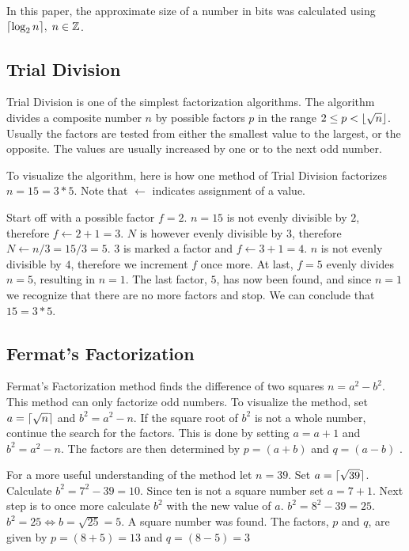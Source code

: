 In this paper, the approximate size of a number in bits was calculated using $\lceil\log_2{n}\rceil,\;n\in\mathbb{Z}$.

\subsection{Trial Division}
Trial Division is one of the simplest factorization algorithms. The algorithm divides a composite number $n$ by possible factors $p$ in the range $2 \leq p < \lfloor\sqrt{n}\rfloor$. Usually the factors are tested from either the smallest value to the largest, or the opposite. The values are usually increased by one or to the next odd number\cite{trialDivisionAndFermats}.

To visualize the algorithm, here is how one method of Trial Division factorizes $n=15=3*5$. Note that $\leftarrow$ indicates assignment of a value.

Start off with a possible factor $f=2$. $n=15$ is not evenly divisible by $2$, therefore $f\leftarrow2+1=3$. $N$ is however evenly divisible by $3$, therefore $N\leftarrow n/3=15/3=5$. $3$ is marked a factor and $f\leftarrow3+1=4$. $n$ is not evenly divisible by $4$, therefore we increment $f$ once more. At last, $f=5$ evenly divides $n=5$, resulting in $n=1$. The last factor, $5$, has now been found, and since $n=1$ we recognize that there are no more factors and stop. We can conclude that $15=3*5$.

\subsection{Fermat's Factorization}
Fermat's Factorization method finds the difference of two squares $n = a^2 - b^2$. This method can only factorize odd numbers. To visualize the method, set $a = \lceil\sqrt{n}\rceil$ and $b^2 = a^2 - n$. If the square root of $b^2$ is not a whole number, continue the search for the factors. This is done by setting $a = a + 1$ and $b^2 = a^2 - n$. The factors are then determined by $p = (a + b)$ and $q = (a - b)$ \cite{trialDivisionAndFermats}.

For a more useful understanding of the method let $n=39$. Set $a=\lceil\sqrt{39}\rceil$. Calculate $b^2 = 7^2-39 = 10$. Since ten is not a square number set $a=7+1$. Next step is to once more calculate $b^2$ with the new value of $a$. $b^2 = 8^2-39 = 25$. $b^2=25 \Leftrightarrow b=\sqrt{25} = 5$. A square number was found. The factors, $p$ and $q$, are given by $p=(8+5)=13$ and $q=(8-5)=3$ 

